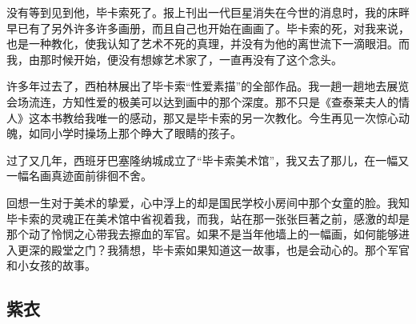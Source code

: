 \par 没有等到见到他，毕卡索死了。报上刊出一代巨星消失在今世的消息时，我的床畔早已有了另外许多许多画册，而且自己也开始在画画了。毕卡索的死，对我来说，也是一种教化，使我认知了艺术不死的真理，并没有为他的离世流下一滴眼泪。而我，由那时候开始，便没有想嫁艺术家了，一直再没有了这个念头。
\par 许多年过去了，西柏林展出了毕卡索“性爱素描”的全部作品。我一趟一趟地去展览会场流连，方知性爱的极美可以达到画中的那个深度。那不只是《查泰莱夫人的情人》这本书教给我唯一的感动，那又是毕卡索的另一次教化。今生再见一次惊心动魄，如同小学时操场上那个睁大了眼睛的孩子。
\par 过了又几年，西班牙巴塞隆纳城成立了“毕卡索美术馆”，我又去了那儿，在一幅又一幅名画真迹面前徘徊不舍。
\par 回想一生对于美术的挚爱，心中浮上的却是国民学校小房间中那个女童的脸。我知毕卡索的灵魂正在美术馆中省视着我，而我，站在那一张张巨著之前，感激的却是那个动了怜悯之心带我去擦血的军官。如果不是当年他墙上的一幅画，如何能够进入更深的殿堂之门？我猜想，毕卡索如果知道这一故事，也是会动心的。那个军官和小女孩的故事。



\subsection{紫衣}


